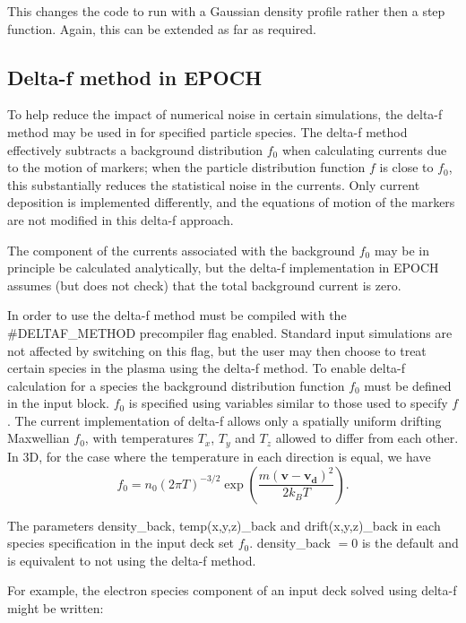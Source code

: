 This changes the code to run with a Gaussian density profile rather then a step
function. Again, this can be extended as far as required.
%

\subsection{Delta-f method in EPOCH}
\label{sec:deltaf}

To help reduce the impact of numerical noise in certain simulations, the
delta-f method may be used in {\EPOCH} for specified particle species. The
delta-f method effectively subtracts a background distribution $f_0$ when
calculating currents due to the motion of markers; when the particle
distribution function $f$ is close to $f_0$, this substantially reduces the
statistical noise in the currents. Only current deposition is implemented
differently, and the equations of motion of the markers are not modified in
this delta-f approach.

The component of the currents associated with the background $f_0$ may be in
principle be calculated analytically, but the delta-f implementation in EPOCH
assumes (but does not check) that the total background current is zero.

In order to use the delta-f method {\EPOCH} must be compiled with the
\#DELTAF\_METHOD precompiler flag enabled. Standard {\EPOCH} input simulations
are not affected by switching on this flag, but the user may then choose to
treat certain species in the plasma using the delta-f method. To enable
delta-f calculation for a species the background distribution function $f_0$
must be defined in the input block. $f_0$ is specified using variables similar
to those used to specify $f$.  The current implementation of delta-f allows
only a spatially uniform drifting Maxwellian $f_0$, with temperatures $T_x$,
$T_y$ and $T_z$ allowed to differ from each other. In 3D, for the case where
the temperature in each direction is equal, we have
\begin{equation*}
  f_0 = n_0 (2 \pi T)^{-3/2}
    \exp\left( \frac{m (\mathbf{v} - \mathbf{v_d})^2}{2 k_B T} \right).
\end{equation*}

The parameters density\_back, temp(x,y,z)\_back and drift(x,y,z)\_back in each
species specification in the input deck set $f_0$. density\_back $=0$ is the
default and is equivalent to not using the delta-f method.

For example, the electron species component of an input deck solved using
delta-f might be written:

